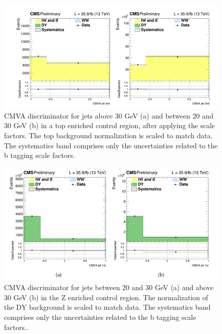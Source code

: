 \begin{figure}
\centering
\includegraphics[scale= 0.4]{../Cap4/cmvaT}
\caption{CMVA discriminator for jets above 30 GeV (a) and between 20 and 30 GeV (b) in a
top enriched control region, after applying the scale factors. The top background normalization
is scaled to match data. The systematics band comprises only the uncertainties related to the b
tagging scale factors.}
\label{cmvaT}
\end{figure}

\begin{figure}
\centering
\includegraphics[scale= 0.4]{../Cap4/cmvaD}
\caption{CMVA discriminator for jets between 20 and 30 GeV (a) and above 30 GeV (b) in the
Z enriched control region. The normalization of the DY background is scaled to match data.
The systematics band comprises only the uncertainties related to the b tagging scale factors..}
\label{cmvaD}
\end{figure}
